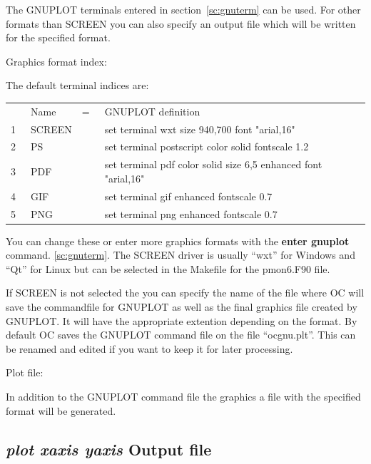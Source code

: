 \documentclass[11pt]{article}
\begin{document}
The GNUPLOT terminals entered in section~\ref{sc:gnuterm} can be used.
For other formats than SCREEN you can also specify an output file
which will be written for the specified format.

Graphics format index:

The default terminal indices are:

\begin{tabular}{rlcl}
  & Name   &=~ & GNUPLOT definition\\
 1~& SCREEN & & set terminal wxt size 940,700 font "arial,16"\\
 2~& PS     & & set terminal postscript color solid fontscale 1.2\\
 3~& PDF    & & set terminal pdf color solid size 6,5 enhanced font "arial,16"\\
 4~& GIF    & & set terminal gif enhanced fontscale 0.7\\
 5~& PNG    & & set terminal png enhanced fontscale 0.7\\
\end{tabular}

You can change these or enter more graphics formats with the {\bf
  enter gnuplot} command. \ref{sc:gnuterm}.  The SCREEN driver is
usually ``wxt'' for Windows and ``Qt'' for Linux but can be selected in
the Makefile for the pmon6.F90 file.

If SCREEN is not selected the you can specify the name of the file
where OC will save the commandfile for GNUPLOT as well as the final
graphics file created by GNUPLOT.  It will have the appropriate
extention depending on the format.  By default OC saves the GNUPLOT
command file on the file ``ocgnu.plt''.  This can be renamed and
edited if you want to keep it for later processing.

Plot file:

In addition to the GNUPLOT command file the graphics a file with the
specified format will be generated.

\hypertarget{Plot file}{}
\subsection{{\em plot xaxis yaxis} Output file}
\end{document}
